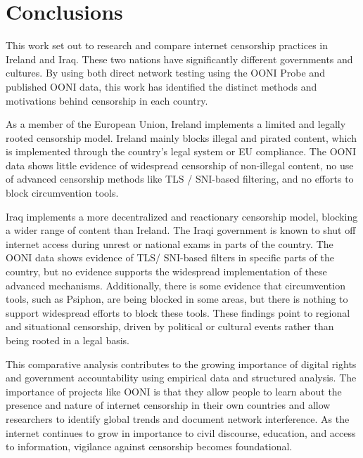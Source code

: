 \chapter{Conclusions}

This work set out to research and compare internet censorship practices in Ireland and Iraq. These two nations have significantly different governments and cultures. By using both direct network testing using the OONI Probe and published OONI data, this work has identified the distinct methods and motivations behind censorship in each country. 

As a member of the European Union, Ireland implements a limited and legally rooted censorship model. Ireland mainly blocks illegal and pirated content, which is implemented through the country's legal system or EU compliance. The OONI data shows little evidence of widespread censorship of non-illegal content, no use of advanced censorship methods like TLS / SNI-based filtering, and no efforts to block circumvention tools.

Iraq implements a more decentralized and reactionary censorship model, blocking a wider range of content than Ireland. The Iraqi government is known to shut off internet access during unrest or national exams in parts of the country. The OONI data shows evidence of TLS/ SNI-based filters in specific parts of the country, but no evidence supports the widespread implementation of these advanced mechanisms. Additionally, there is some evidence that circumvention tools, such as Psiphon, are being blocked in some areas, but there is nothing to support widespread efforts to block these tools. These findings point to regional and situational censorship, driven by political or cultural events rather than being rooted in a legal basis.

This comparative analysis contributes to the growing importance of digital rights and government accountability using empirical data and structured analysis. The importance of projects like OONI is that they allow people to learn about the presence and nature of internet censorship in their own countries and allow researchers to identify global trends and document network interference. As the internet continues to grow in importance to civil discourse, education, and access to information, vigilance against censorship becomes foundational.
